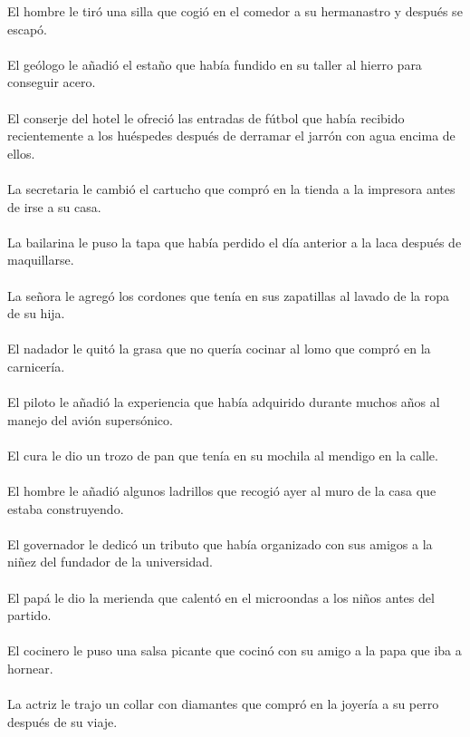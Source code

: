 El hombre le tiró una silla que cogió en el comedor a su hermanastro y después se escapó.	\\	\\
El geólogo le añadió el estaño que había fundido en su taller al hierro para conseguir acero.	\\	\\
El conserje del hotel le ofreció las entradas de fútbol que había recibido recientemente a los huéspedes después de derramar el  jarrón con agua encima de ellos.	\\	\\
La secretaria le cambió el cartucho que compró en la tienda a la impresora antes de irse a su casa.	\\	\\
La bailarina le puso la tapa que había perdido el día anterior a la laca después de maquillarse.	\\	\\
La señora le agregó los cordones que tenía en sus zapatillas al lavado de la ropa de su hija.	\\	\\
El nadador le quitó la grasa que no quería cocinar al lomo que compró en la carnicería.	\\	\\
El piloto le añadió la experiencia que había adquirido durante muchos años al manejo del avión supersónico.	\\	\\
El cura le dio un trozo de pan que tenía en su mochila al mendigo en la calle.	\\	\\
El hombre le añadió algunos ladrillos que recogió ayer al muro de la casa que estaba construyendo.	\\	\\
El governador le dedicó un tributo que había organizado con sus amigos a la niñez del fundador de la universidad.	\\	\\
El papá le dio la merienda que calentó en el microondas a los niños antes del partido.	\\	\\
El cocinero le puso una salsa picante que cocinó con su amigo a la papa que iba a hornear.	\\	\\
La actriz le trajo un collar con diamantes que compró en la joyería a su perro después de su viaje.	\\	\\
